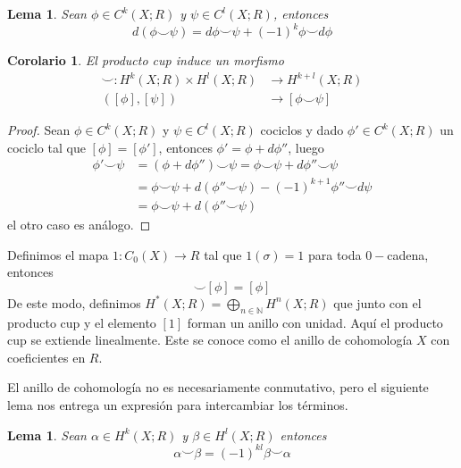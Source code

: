 \documentclass[aop]{imsart2}
\theoremstyle{plain}
\newtheorem{lema}[teo]{Lema}
\newtheorem{cor}[teo]{Corolario}
\theoremstyle{remark}
\def \N {\mathbb{N}}
\begin{document}
\begin{lema}
    Sean $\phi\in C^{k}(X;R)$ y $\psi\in C^{l}(X;R)$, entonces
    \begin{equation*}
        d(\phi\smile\psi)=d\phi\smile\psi+(-1)^{k}\phi\smile d\phi
    \end{equation*}
\end{lema}

\begin{cor}
    El producto cup induce un morfismo
    \begin{align*}
        \smile:H^{k}(X;R)\times H^{l}(X;R) &\to H^{k+l}(X;R) \\
        ([\phi],[\psi]) &\to [\phi\smile\psi]
    \end{align*}
\end{cor}

\begin{proof}
    Sean $\phi\in C^{k}(X;R)$ y $\psi\in C^{l}(X;R)$ cociclos y dado $\phi'\in C^{k}(X;R)$ un 
    cociclo tal que $[\phi]=[\phi']$, entonces $\phi'=\phi+d\phi''$, luego
    \begin{align*}
        \phi'\smile\psi &= (\phi+d\phi'')\smile\psi=\phi\smile\psi+d\phi''\smile\psi \\
        &= \phi\smile\psi+d(\phi''\smile\psi)-(-1)^{k+1}\phi''\smile d\psi \\
        &= \phi\smile\psi+d(\phi''\smile\psi)
    \end{align*}
    el otro caso es análogo.
\end{proof}

\noindent Definimos el mapa $1:C_{0}(X)\to R$ tal que $1(\sigma)=1$ para toda $0-$cadena, entonces
\begin{equation*}
    [1]\smile[\phi]=[\phi]
\end{equation*}
De este modo, definimos $H^{*}(X;R)=\bigoplus_{n\in\N}H^{n}(X;R)$ que junto con el producto cup y
el elemento $[1]$ forman un anillo con unidad. Aquí el producto cup se extiende linealmente. 
Este se conoce como el anillo de cohomología $X$ con coeficientes en $R$.

\vspace{2mm}
\noindent El anillo de cohomología no es necesariamente conmutativo, pero el siguiente lema nos 
entrega un expresión para intercambiar los términos.

\begin{lema}
    Sean $\alpha\in H^{k}(X;R)$ y $\beta\in H^{l}(X;R)$ entonces
    \begin{equation*}
        \alpha\smile\beta=(-1)^{kl}\beta\smile\alpha
    \end{equation*}
\end{lema}
\end{document}
